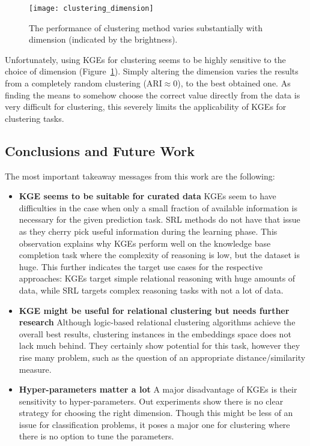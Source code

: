\begin{figure}
	\centering
	\texttt{[image: clustering\_dimension]}
	\caption{The performance of clustering method varies substantially with dimension (indicated by the brightness). }
	\label{fig:clusVariance}
\end{figure}



Unfortunately, using KGEs for clustering seems to be highly sensitive to the choice of dimension (Figure~\ref{fig:clusVariance}).
Simply altering the dimension varies the results from a completely random clustering (ARI$\approx 0$), to the best obtained one.
As finding the means to somehow choose the correct value directly from the data is very difficult for clustering, this severely limits the applicability of KGEs for clustering tasks.



\subsection{Conclusions and Future Work}


The most important takeaway messages from this work are the following:
\begin{itemize}
	\item \textbf{KGE seems to be suitable for curated data} KGEs seem to have difficulties in the case when only a small fraction of available information is necessary for the given prediction task. SRL methods do not have that issue as they cherry pick useful information during the learning phase. This observation explains why KGEs perform well on the knowledge base completion task where the complexity of reasoning is low, but the dataset is huge. This further indicates the target use cases for the respective approaches: KGEs target simple relational reasoning with huge amounts of data, while SRL targets complex reasoning tasks with not a lot of data.
	\item \textbf{KGE might be useful for relational clustering but needs further research} Although logic-based relational clustering algorithms achieve the overall best results, clustering instances in the embeddings space does not lack much behind. They certainly show potential for this task, however they rise many problem, such as the question of an appropriate distance/similarity measure.
	\item \textbf{Hyper-parameters matter a lot} A major disadvantage of KGEs is their sensitivity to hyper-parameters. Out experiments show there is no clear strategy for choosing the right dimension. Though this might be less of an issue for classification problems, it poses a major one for clustering where there is no option to tune the parameters.
\end{itemize}


